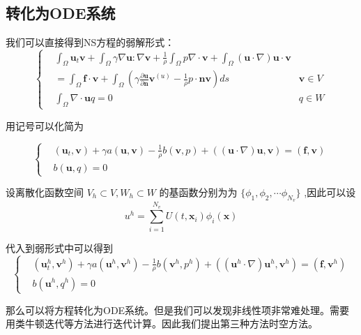 \subsection{转化为ODE系统}
我们可以直接得到NS方程的弱解形式：
\begin{equation*}\left\{
    \begin{aligned}
        &\int_\Omega \textbf{u}_t \textbf{v} + \int_\Omega \gamma \nabla \textbf{u}:\nabla\textbf{v} + \frac{1}{\rho}\int_\Omega p\nabla \cdot\textbf{v}+\int_\Omega(\textbf{u}\cdot \nabla) \textbf{u}\cdot\textbf{v}\\
        &=\int_\Omega \textbf{f}\cdot\textbf{v}+ \int_\Omega\left(\gamma\frac{\partial \textbf{u}}{\partial \textbf{n}}\textbf{v}^{(u)}-\frac{1}{\rho}p\cdot\textbf{n}\textbf{v}\right)ds\qquad &\textbf{v}\in V\\
        &\int_\Omega \nabla\cdot \textbf{u} q=0 &q\in W
    \end{aligned}\right.
\end{equation*}

用记号可以化简为

\begin{equation*}\left\{
    \begin{aligned}
        &(\textbf{u}_t, \textbf{v})+\gamma a(\textbf{u}, \textbf{v})-\frac{1}{\rho}b(\textbf{v}, p)+((\textbf{u}\cdot \nabla)\textbf{u}, \textbf{v})=(\textbf{f}, \textbf{v})\\
        &b(\textbf{u}, q)=0
    \end{aligned}\right.
\end{equation*}

设离散化函数空间 $V_h\subset V, W_h\subset W$ 的基函数分别为为 $\{\phi_1, \phi_2,\cdots \phi_{N_v}\}$ ,因此可以设 $$u^h=\sum_{i=1}^{N_v}U(t,\textbf{x}_i)\phi_i(\textbf{x})$$ 

代入到弱形式中可以得到
\begin{equation*}\left\{
    \begin{aligned}
        &(\textbf{u}^h_t, \textbf{v}^h)+\gamma a(\textbf{u}^h, \textbf{v}^h)-\frac{1}{\rho}b(\textbf{v}^h, p^h)+((\textbf{u}^h\cdot \nabla)\textbf{u}^h, \textbf{v}^h)=(\textbf{f}, \textbf{v}^h)\\
        &b(\textbf{u}^h, q^h)=0
    \end{aligned}\right.
\end{equation*}

那么可以将方程转化为ODE系统。但是我们可以发现非线性项非常难处理。需要用类牛顿迭代等方法进行迭代计算。因此我们提出第三种方法时空方法。

